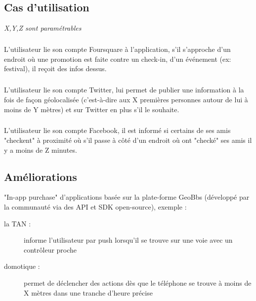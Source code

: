 \documentclass[a4paper,12pt]{report}
\begin{document}
\begin{onehalfspace}
  \chapter*{Cas d’utilisation}

  \emph{X,Y,Z sont paramétrables}

  \paragraph{}
  L’utilisateur lie son compte Foursquare à l’application, s’il s’approche d’un endroit où une promotion est faite contre un check-in, d’un événement (ex: festival), il reçoit des infos dessus.

  \paragraph{}
  L’utilisateur lie son compte Twitter, lui permet de publier une information à la fois de façon géolocalisée (c'est-à-dire aux X premières personnes autour de lui à moins de Y mètres) et sur Twitter en plus s’il le souhaite.

  \paragraph{}
  L’utilisateur lie son compte Facebook, il est informé si certains de ses amis "checkent" à proximité où s’il passe à côté d’un endroit où ont "checké" ses amis il y a moins de Z minutes.

  \section*{Améliorations}

  "In-app purchase" d’applications basée sur la plate-forme GeoBbs (développé par la communauté via des API et SDK open-source), exemple :
    \begin{description}
    \item[la TAN :] informe l’utilisateur par push lorsqu’il se trouve sur une voie avec un contrôleur proche
    \item[domotique :] permet de déclencher des actions dès que le téléphone se trouve à moins de X mètres dans une tranche d’heure précise
    \end{description}

  \end{onehalfspace}
\end{document}
